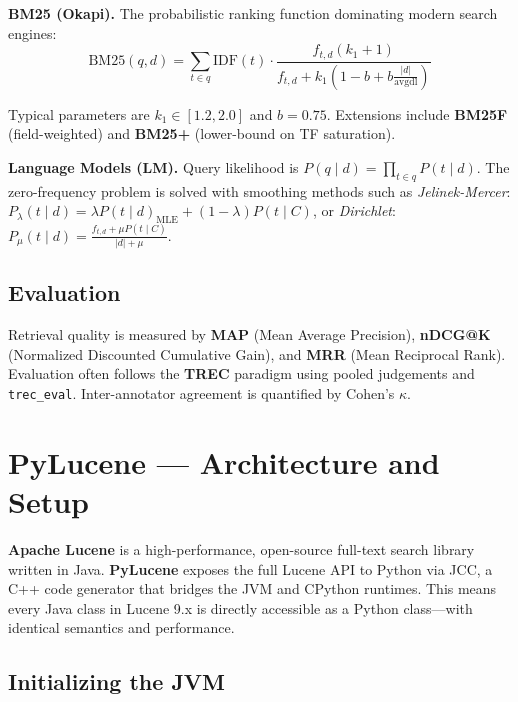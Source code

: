 \documentclass[11pt,a4paper]{article}
\begin{document}
\textbf{BM25 (Okapi).} The probabilistic ranking function dominating modern search engines:
\vspace{-0.5em}
\begin{equation}
  \text{BM25}(q,d) = \sum_{t\in q} \text{IDF}(t) \cdot \frac{f_{t,d}(k_1+1)}{f_{t,d}+k_1(1-b+b\frac{|d|}{\text{avgdl}})}
\end{equation}
\vspace{-0.5em}

Typical parameters are $k_1 \in [1.2, 2.0]$ and $b = 0.75$. Extensions include \textbf{BM25F} (field-weighted) and \textbf{BM25+} (lower-bound on TF saturation).

\textbf{Language Models (LM).} Query likelihood is $P(q\mid d) = \prod_{t\in q} P(t\mid d)$. The zero-frequency problem is solved with smoothing methods such as \emph{Jelinek-Mercer}: $P_\lambda(t\mid d) = \lambda P(t\mid d)_\text{MLE} + (1-\lambda)P(t\mid C)$, or \emph{Dirichlet}: $P_\mu(t\mid d) = \frac{f_{t,d}+\mu P(t\mid C)}{|d|+\mu}$.

\subsection{Evaluation}
Retrieval quality is measured by \textbf{MAP} (Mean Average Precision), \textbf{nDCG@K} (Normalized Discounted Cumulative Gain), and \textbf{MRR} (Mean Reciprocal Rank). Evaluation often follows the \textbf{TREC} paradigm using pooled judgements and \texttt{trec\_eval}. Inter-annotator agreement is quantified by Cohen's $\kappa$.

\newpage
\section{PyLucene — Architecture and Setup}

\textbf{Apache Lucene} is a high-performance, open-source full-text search
library written in Java. \textbf{PyLucene} exposes the full Lucene API to Python
via JCC, a C++ code generator that bridges the JVM and CPython runtimes.
This means every Java class in Lucene 9.x is directly accessible as a Python
class—with identical semantics and performance.

\subsection{Initializing the JVM}
\end{document}
